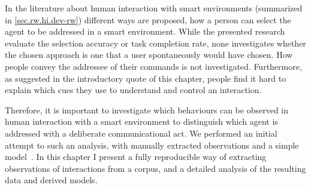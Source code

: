 In the literature about human interaction with \glspl{smart environment} (summarized in \cref{sec.rw.hi.dev-rw}) different ways are proposed, how a person can select the agent to be addressed in a \gls{smart environment}.
While the presented research evaluate the selection \gls{accuracy} or task completion rate, none investigates whether the chosen approach is one that a \naive{} user spontaneously would have chosen.
How \naive{} people convey the \gls{addressee} of their commands is not investigated.
Furthermore, as suggested in the introductory quote of this chapter, people find it hard to explain which cues they use to understand and control an interaction.

Therefore, it is important to investigate which behaviours can be observed in \naive{} human interaction with a \gls{smart environment} to distinguish which agent is addressed with a deliberate communicational act.
We performed an initial attempt to such an analysis, with manually extracted observations and a simple model~\cite{Richter2016}.
In this chapter I present a fully reproducible way of extracting observations of interactions from a corpus, and a detailed analysis of the resulting data and derived models.

